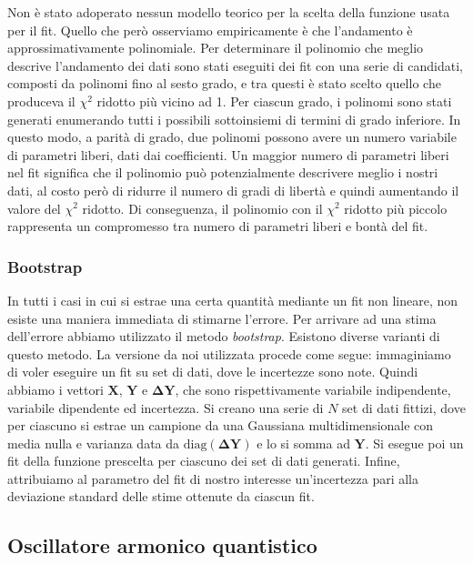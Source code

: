 \documentclass[11pt, a4paper]{article}
\begin{document}
Non è stato adoperato nessun modello teorico per la scelta della funzione usata per il fit. Quello che però osserviamo empiricamente è che l'andamento è approssimativamente polinomiale.
Per determinare il polinomio che meglio descrive l'andamento dei dati sono stati eseguiti dei fit con una serie di candidati, composti da polinomi fino al sesto grado, e tra questi è stato scelto quello che produceva il $\chi^2$ ridotto più vicino ad 1.
Per ciascun grado, i polinomi sono stati generati enumerando tutti i possibili sottoinsiemi di termini di grado inferiore.
In questo modo, a parità di grado, due polinomi possono avere un numero variabile di parametri liberi, dati dai coefficienti. Un maggior numero di parametri liberi nel fit significa che il polinomio
può potenzialmente descrivere meglio i nostri dati, al costo però di ridurre il numero di gradi di libertà e quindi aumentando il valore del $\chi^2$ ridotto.
Di conseguenza, il polinomio con il $\chi^2$ ridotto più piccolo rappresenta un compromesso tra numero di parametri liberi e bontà del fit.

\subsubsection{Bootstrap}

In tutti i casi in cui si estrae una certa quantità mediante un fit non lineare, non esiste una maniera immediata di stimarne l'errore.
Per arrivare ad una stima dell'errore abbiamo utilizzato il metodo \emph{bootstrap}. Esistono diverse varianti di questo metodo. La versione da noi utilizzata procede come segue:
immaginiamo di voler eseguire un fit su set di dati, dove le incertezze sono note. Quindi abbiamo i vettori $\mathbf{X}$, $\mathbf{Y}$ e $\mathbf{\Delta Y}$, che sono rispettivamente variabile indipendente, variabile dipendente ed incertezza.
Si creano una serie di $N$ set di dati fittizi, dove per ciascuno si estrae un campione da una Gaussiana multidimensionale con media nulla e varianza data da $\mathrm{diag}(\mathbf{\Delta Y})$ e lo si somma ad $\mathbf{Y}$. Si esegue poi un fit della funzione prescelta per ciascuno dei set di dati generati.
Infine, attribuiamo al parametro del fit di nostro interesse un'incertezza pari alla deviazione standard delle stime ottenute da ciascun fit.


\subsection{Oscillatore armonico quantistico}
\end{document}
